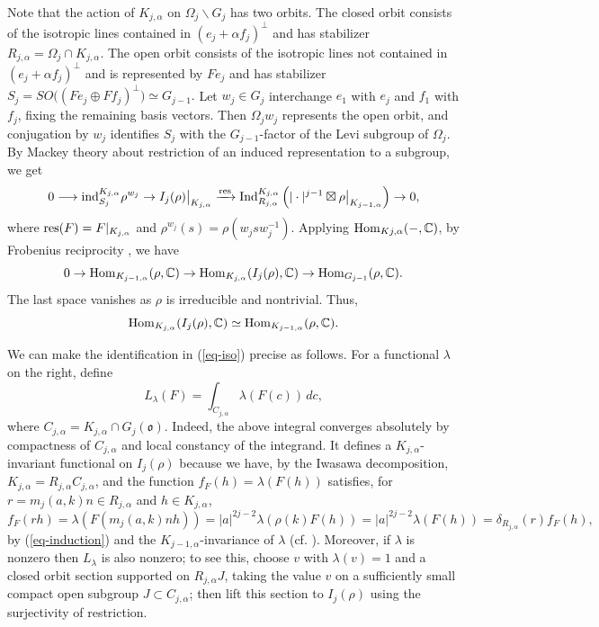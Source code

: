 \documentclass[12pt]{amsart}
\theoremstyle{definition}
\theoremstyle{remark}
\begin{document}
Note that the action of $K_{j,\alpha}$ on $\Omega_j\backslash G_j$ has two orbits. The closed orbit consists of the isotropic lines contained in $(e_j+\alpha f_j)^\perp$ and has stabilizer $R_{j,\alpha}=\Omega_j\cap K_{j,\alpha}$. The open orbit consists of the isotropic lines not contained in $(e_j+\alpha f_j)^\perp$ and is represented by $Fe_j$ and has stabilizer
$
S_j= SO \bigl((Fe_j\oplus Ff_j)^\perp\bigr)
\simeq G_{j-1}.
$
Let $w_j\in G_j$ interchange $e_1$ with $e_j$ and $f_1$ with $f_j$, fixing the remaining basis vectors. Then $\Omega_jw_j$ represents the open orbit, and conjugation by $w_j$ identifies $S_j$ with the $G_{j-1}$-factor of the Levi subgroup of $\Omega_j$. 
By Mackey theory about restriction of an induced representation to a
subgroup, we get
\[
0\longrightarrow
{\rm ind}_{S_j}^{K_{j,\alpha}}\rho^{w_j}
\rightarrow
I_j(\rho)\big|_{K_{j,\alpha}}
\xrightarrow{ {\rm res}}
{\rm Ind}_{R_{j,\alpha}}^{K_{j,\alpha}}
\left(
|\cdot |^{j-1}\boxtimes
\rho \big|_{K_{j-1,\alpha}}
\right)
\rightarrow 0,
\]
where ${\rm res}(F)=F|_{K_{j,\alpha}}$ and $\rho^{w_j}(s)=\rho(w_jsw_j^{-1})$.
Applying ${\rm Hom}_{K{j,\alpha}}(-,\mathbb C)$, by Frobenius reciprocity \cite[Corollary 2.4.3]{cas95}, we have 
\[
0\rightarrow
{\rm Hom}_{K_{j-1,\alpha}}(\rho,\mathbb C)
\rightarrow
{\rm Hom}_{K_{j,\alpha}}(I_j(\rho),\mathbb C)
\rightarrow
{\rm Hom}_{G_{j-1}}(\rho,\mathbb C).
\]
The last space vanishes as $\rho$ is irreducible and nontrivial. Thus,
\begin{equation}\label{eq-iso}
{\rm Hom}_{K_{j,\alpha}}(I_j(\rho),\mathbb C)
\simeq
{\rm Hom}_{K_{j-1,\alpha}}(\rho,\mathbb C).
\end{equation}

We can make the identification in (\ref{eq-iso}) precise as follows. For a functional $\lambda$ on the right, define
\[
L_\lambda(F) = 
\int_{C_{j,\alpha}}\lambda(F(c))\,dc,
\]
where $C_{j,\alpha}=K_{j,\alpha}\cap G_j(\mathfrak o)$. Indeed, the above integral converges absolutely by compactness of $C_{j,\alpha}$ and local constancy of the integrand. It defines a $K_{j,\alpha}$-invariant functional on $I_j(\rho)$ because we have, by the Iwasawa decomposition, $K_{j,\alpha}=R_{j,\alpha}C_{j,\alpha}$, and 
the function $f_F(h)=\lambda(F(h))$
satisfies, for $r=m_j(a,k)n\in R_{j,\alpha}$ and $h\in K_{j,\alpha}$,
\[
f_F(rh)
=\lambda\!\left(F(m_j(a,k)nh)\right)
=|a|^{2j-2}\lambda\!\left(\rho(k)F(h)\right)
=|a|^{2j-2}\lambda(F(h))
=\delta_{R_{j,\alpha}}(r)f_F(h),
\]
by (\ref{eq-induction}) and the $K_{j-1,\alpha}$-invariance of $\lambda$ (cf. \cite[Proposition 3.1.3 and its proof]{cas95}). Moreover, if $\lambda$ is nonzero then $L_\lambda$ is also nonzero; to see this, choose $v$ with $\lambda(v)=1$ and a closed orbit section supported on $R_{j,\alpha}J$, taking the value $v$ on a sufficiently small compact open subgroup $J\subset C_{j,\alpha}$; then lift this section to $I_j(\rho)$ using the surjectivity of restriction.
\end{document}
